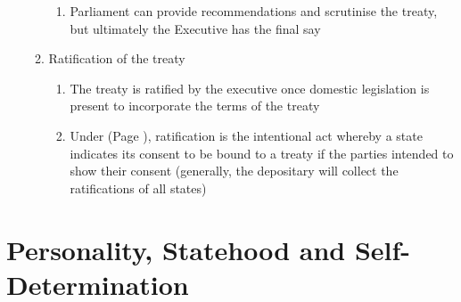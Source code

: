 \begin{enumerate}
\begin{enumerate}
\begin{enumerate}
            \item Parliament can provide recommendations and scrutinise the treaty, but ultimately the Executive has the final say
        \end{enumerate}
        \item Ratification of the treaty
        \begin{enumerate}
            \item The treaty is ratified by the executive once domestic legislation is present to incorporate the terms of the treaty
            \item Under  (Page \pageref{VCLT Art 2}), ratification is the intentional act whereby a state indicates its consent to be bound to a treaty if the parties intended to show their consent (generally, the depositary will collect the ratifications of all states)
        \end{enumerate}
    \end{enumerate}
\end{enumerate}

\section{Personality, Statehood and Self-Determination}


